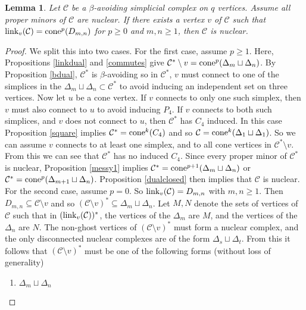 \documentclass[letterpaper,12pt]{amsart}
\theoremstyle{plain}
\newtheorem{lemma}[thm]{Lemma}
\theoremstyle{definition}
\theoremstyle{remark}
\newcommand{\calc}{\mathcal{C}}
\newcommand{\link}{\textnormal{link}}
\newcommand{\cone}{\textnormal{cone}}
\begin{document}
\begin{lemma}\label{case4}
	Let $\mathcal{C}$ be a $\beta$-avoiding simplicial complex on $q$ vertices.
	Assume all proper minors of $\mathcal{C}$ are nuclear.
	If there exists a vertex $v$ of $\mathcal{C}$ such that $\link_v(\mathcal{C}) = \cone^p(D_{m,n})$
	for $p \ge 0$ and $m,n \ge 1$,
	then $\mathcal{C}$ is nuclear.
\end{lemma}
\begin{proof}
	{We split this into two cases.
	For the first case, assume $p \ge 1$.
	Here, Propositions \ref{linkdual} and \ref{commutes} give $\mathcal{C}^*\setminus v = \cone^p(\Delta_m\sqcup\Delta_n)$.
	By Proposition \ref{bdual},
	$\calc^*$ is $\beta$-avoiding so in $\calc^*$, $v$ must connect to one of the simplices in the $\Delta_m\sqcup \Delta_n \subset \mathcal{C}^*$
	to avoid inducing an independent set on three vertices.
	Now let $u$ be a cone vertex.
	If $v$ connects to only one such simplex, then $v$ must also connect to $u$ to avoid inducing $P_4$.
	If $v$ connects to both such simplices, and $v$ does not connect to $u$, then $\mathcal{C}^*$
	has $C_4$ induced.
	In this case Proposition \ref{square} implies $\mathcal{C}^* = \cone^k(C_4)$
	and so $\mathcal{C} = \cone^k(\Delta_1 \sqcup \Delta_1)$.
	So we can assume $v$ connects to at least one simplex, and to all cone vertices in $\calc^*\setminus v$.
	From this we can see that $\mathcal{C}^*$ has no induced $C_4$.
	Since every proper minor of $\mathcal{C}^*$ is nuclear, Proposition \ref{messy1} implies
	$\mathcal{C}^* = \cone^{p+1}(\Delta_m \sqcup \Delta_n)$ or $\mathcal{C}^* = \cone^p(\Delta_{m+1}\sqcup \Delta_n)$.
	Proposition \ref{dualclosed} then implies that $\calc$ is nuclear.}
	\\
	\indent
	For the second case, assume $p = 0$.
	So $\link_v(\mathcal{C}) = D_{m,n}$ with $m,n \ge 1$.
	Then $D_{m,n} \subseteq \mathcal{C}\setminus v$
	and so $(\mathcal{C}\setminus v)^* \subseteq \Delta_m \sqcup \Delta_n$.
	Let $M,N$ denote the sets of vertices of $\mathcal{C}$ such that 
	in $(\link_v(\mathcal{C}))^*$, the vertices of the $\Delta_m$ are $M$, and the vertices of the $\Delta_n$ are $N$.
	The non-ghost vertices of $(\mathcal{C}\setminus v)^*$ must form a nuclear complex,
	and the only disconnected nuclear complexes are of the form $\Delta_s \sqcup \Delta_t$.
	From this it follows that $(\mathcal{C}\setminus v)^*$ must be one of the following forms (without loss of generality)
	\begin{enumerate}
		\item $\Delta_m \sqcup \Delta_n$

\end{enumerate}
\end{proof}
\end{document}

